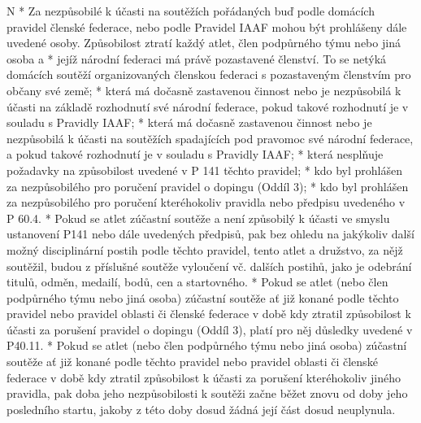\begitems \style N
* Za nezpůsobilé k účasti na soutěžích pořádaných buď podle domácích pravidel členské federace, nebo podle Pravidel IAAF mohou být prohlášeny dále uvedené osoby.
Způsobilost ztratí každý atlet, člen podpůrného týmu nebo jiná osoba
  \begitems \style a
  * jejíž národní federaci má právě pozastavené členství. To se netýká domácích soutěží organizovaných členskou federaci s pozastaveným členstvím pro občany své země;
  * která má dočasně zastavenou činnost nebo je nezpůsobilá k účasti na základě rozhodnutí své národní federace, pokud takové rozhodnutí je v souladu s Pravidly IAAF;
  * která má dočasně zastavenou činnost nebo je nezpůsobilá k účasti na soutěžích spadajících pod pravomoc své národní federace, a pokud takové rozhodnutí je v souladu s Pravidly IAAF;
  * která nesplňuje požadavky na způsobilost uvedené v P 141 těchto pravidel;
  * kdo byl prohlášen za nezpůsobilého pro poručení pravidel o dopingu (Oddíl 3);
  * kdo byl prohlášen za nezpůsobilého pro poručení kteréhokoliv pravidla nebo předpisu uvedeného v P 60.4.
  \enditems
* Pokud se atlet zúčastní soutěže a není způsobilý k účasti ve smyslu ustanovení P141 nebo dále uvedených předpisů, pak bez ohledu na jakýkoliv další možný disciplinární postih podle těchto pravidel, tento atlet a družstvo, za nějž soutěžil, budou z příslušné soutěže vyloučení vč. dalších postihů, jako je odebrání titulů, odměn, medailí, bodů, cen a startovného.
* Pokud se atlet (nebo člen podpůrného týmu nebo jiná osoba) zúčastní soutěže ať již konané podle těchto pravidel nebo pravidel oblasti či členské federace v době kdy ztratil způsobilost k účasti za porušení pravidel o dopingu (Oddíl 3), platí pro něj důsledky uvedené v P40.11.
* Pokud se atlet (nebo člen podpůrného týmu nebo jiná osoba) zúčastní soutěže ať již konané podle těchto pravidel nebo pravidel oblasti či členské federace v době kdy ztratil způsobilost k účasti za porušení kteréhokoliv jiného pravidla, pak doba jeho nezpůsobilosti k soutěži začne běžet znovu od doby jeho posledního startu, jakoby z této doby dosud žádná její část dosud neuplynula.
\enditems

\endinput